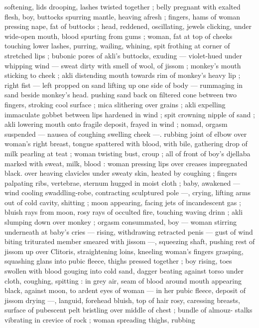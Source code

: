 {softening, lids drooping, lashes twisted together ; belly pregnant with 
exalted flesh, boy, buttocks spurring mantle, heaving afresh ; fingers, 
hams of woman pressing nape, fat of buttocks ; head, reddened, 
oscillating, jewels clicking, under wide-open mouth, blood spurting 
from gums ; woman, fat at top of cheeks touching lower lashes, 
purring, wailing, whining, spit frothing at corner of stretched lips ; 
bubonic pores of akli's buttocks, exuding --- violet-hued under 
whipping wind --- sweat dirty with smell of wool, of jissom ; 
monkey's mouth sticking to cheek ; akli distending mouth towards 
rim of monkey's heavy lip ; right fist --- left propped on sand lifting 
up one side of body --- rummaging in sand beside monkey's head. 
pushing sand back on filtered cone between two fingers, stroking 
cool surface ; mica slithering over grains ; akli expelling immaculate 
gobbet between lips hardened in wind ; spit crowning nipple of sand 
; akli lowering mouth onto fragile deposit, frayed in wind ; nomad, 
orgasm suspended --- nausea of coughing swelling cheek ---. 
rubbing joint of elbow over woman's right breast, tongue spattered 
with blood, with bile, gathering drop of milk pearling at teat ; woman 
twisting bust, croup ; all of front of boy's djellaba marked with sweat, 
milk, blood : woman pressing lips over creases impregnated black. 
over heaving clavicles under sweaty skin, heated by coughing ; 
fingers palpating ribs, vertebrae, sternum hugged in moist cloth ; 
baby, awakened --- wind cooling swaddling-robe, contracting 
sculptured pole ---, crying, lifting arms out of cold cavity, shitting ; 
moon appearing, facing jets of incandescent gas ; bluish rays from 
moon, rosy rays of occulted fire, touching waving drinn ; akli 
slumping down over monkey ; orgasm consummated, boy --- woman 
stirring underneath at baby's cries --- rising, withdrawing retracted 
penis --- gust of wind biting triturated member smeared with jissom 
---, squeezing shaft, pushing rest of jissom up over Clitoris, 
straightening loins, kneeling woman's fingers grasping, squashing 
glans into pubic fleece, thighs pressed together ; boy rising, toes 
swollen with blood gouging into cold sand, dagger beating against 
torso under cloth, coughing, spitting : in grey air, seam of blood 
around mouth appearing black, against moon, to ardent eyes of 
woman --- in her pubic fleece, deposit of jissom drying ---, languid, 
forehead bluish, top of hair rosy, caressing breasts, surface of 
pubescent pelt bristling over middle of chest ; bundle of almouz- 
stalks vibrating in crevice of rock ; woman spreading thighs, rubbing 
}
